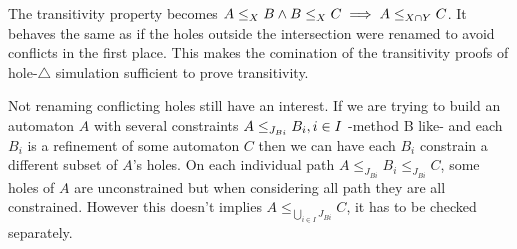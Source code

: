 \documentclass{article}
\begin{document}
The transitivity property becomes \(\wrel{A}{B}{X} \wedge \wrel{B}{C}{X} \implies \wrel{A}{C}{X \cap Y}\).
It behaves the same as if the holes outside the intersection were renamed to avoid conflicts in the first place.
This makes the comination of the transitivity proofs of hole-\(\triangle\) simulation sufficient to prove transitivity.

Not renaming conflicting holes still have an interest.
If we are trying to build an automaton \(A\) with several constraints \(\wrel{A}{B_i}{J_{Bi}}, i \in I\) -method B like- and each \(B_i\) is a refinement of some automaton \(C\) then we can have each \(B_i\) constrain a different subset of \(A\)'s holes.
On each individual path \(A \leq_{J_{Bi}} B_i \leq_{J_{Bi}} C\), some holes of \(A\) are unconstrained but when considering all path they are all constrained.
However this doesn't implies \(A \leq_{\bigcup_{i \in I} J_{Bi}} C\), it has to be checked separately.
\end{document}

